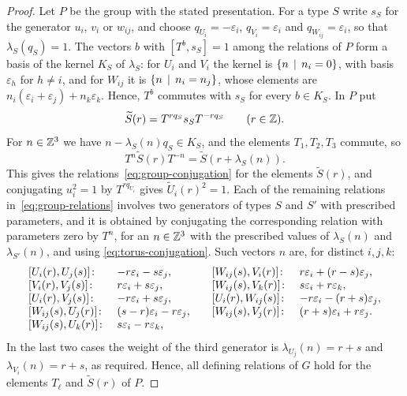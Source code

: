 \begin{proof}
  Let $P$ be the group with the stated presentation. For a type $S$ write $s_S$
  for the generator $u_i$, $v_i$ or $w_{ij}$, and choose
  ${q_{U_i}=-\varepsilon_i}$, ${q_{V_i}=\varepsilon_i}$ and
  ${q_{W_{ij}}=\varepsilon_i}$, so that ${\lambda_S(q_S)=1}$. The vectors $b$ with
  ${[T^b,s_S]=1}$ among the relations of $P$ form a basis of the kernel $K_S$ of
  $\lambda_S$: for $U_i$ and $V_i$ the kernel is ${\set{n}[n_i=0]}$, with basis
  $\varepsilon_h$ for ${h\neq i}$, and for $W_{ij}$ it is ${\set{n}[n_i=n_j]}$,
  whose elements are ${n_i(\varepsilon_i+\varepsilon_j)+n_k\varepsilon_k}$.
  Hence, $T^b$ commutes with $s_S$ for every ${b\in K_S}$. In $P$ put
  \[
    \widetilde{S}(r)=T^{rq_S}s_ST^{-rq_S}\qquad(r\in\mathbb{Z}).
  \]
  For ${n\in\mathbb{Z}^3}$ we have ${n-\lambda_S(n)q_S\in K_S}$, and the elements
  $T_1,T_2,T_3$ commute, so
  \begin{equation}
    \label{eq:torus-conjugation}
    T^n\widetilde{S}(r)T^{-n}=\widetilde{S}(r+\lambda_S(n)).
  \end{equation}
  This gives the relations~\eqref{eq:group-conjugation} for the elements
  $\widetilde{S}(r)$, and conjugating ${u_i^2=1}$ by $T^{rq_{U_i}}$ gives
  ${\widetilde{U}_i(r)^2=1}$. Each of the remaining relations
  in~\eqref{eq:group-relations} involves two generators of types $S$ and $S'$
  with prescribed parameters, and it is obtained by conjugating the
  corresponding relation with parameters zero by $T^n$, for an ${n\in\mathbb{Z}^3}$
  with the prescribed values of $\lambda_S(n)$ and $\lambda_{S'}(n)$, and using
  \eqref{eq:torus-conjugation}. Such vectors $n$ are, for distinct $i,j,k$:
  \[
    \begin{array}{ll@{\qquad}ll}
      [U_i(r),U_j(s)]\colon&-r\varepsilon_i-s\varepsilon_j, &
      [W_{ij}(s),V_i(r)]\colon&r\varepsilon_i+(r-s)\varepsilon_j,\\{}
      [V_i(r),V_j(s)]\colon&r\varepsilon_i+s\varepsilon_j, &
      [W_{ij}(s),V_k(r)]\colon&s\varepsilon_i+r\varepsilon_k,\\{}
      [U_i(r),V_j(s)]\colon&-r\varepsilon_i+s\varepsilon_j, &
      [U_i(r),W_{ij}(s)]\colon&-r\varepsilon_i-(r+s)\varepsilon_j,\\{}
      [W_{ij}(s),U_j(r)]\colon&(s-r)\varepsilon_i-r\varepsilon_j, &
      [W_{ij}(s),V_j(r)]\colon&(r+s)\varepsilon_i+r\varepsilon_j.\\{}
      [W_{ij}(s),U_k(r)]\colon&s\varepsilon_i-r\varepsilon_k, &&
    \end{array}
  \]
  In the last two
  cases the weight of the third generator is ${\lambda_{U_j}(n)=r+s}$ and
  ${\lambda_{V_i}(n)=r+s}$, as required. Hence, all defining relations of $G$
  hold for the elements $T_\ell$ and $\widetilde{S}(r)$ of $P$.


\end{proof}
